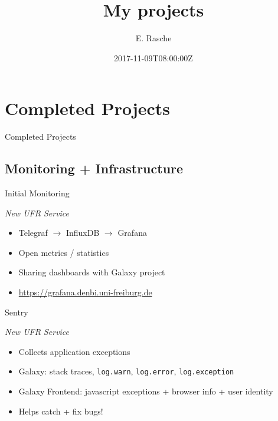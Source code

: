 \documentclass[12pt]{ufrslides}
\title[Projects]{My projects}
\author{E. Rasche}
\date{2017-11-09T08:00:00Z}
\begin{document}
\frame{\titlepage}

\section[Completed]{Completed Projects}
\begin{frame}{Completed Projects}
\end{frame}

\subsection[Monit/Infra]{Monitoring + Infrastructure}
	\begin{frame}{Initial Monitoring}
		\begin{center}
			\emph{New UFR Service}
		\end{center}
		\begin{itemize}
			\item Telegraf $\rightarrow$ InfluxDB $\rightarrow$ Grafana
			\item Open metrics / statistics
			\item Sharing dashboards with Galaxy project
			\item \url{https://grafana.denbi.uni-freiburg.de}
		\end{itemize}
	\end{frame}

	\begin{frame}{Sentry}
		\begin{center}
			\emph{New UFR Service}
		\end{center}
		\begin{itemize}
			\item Collects application exceptions
			\item Galaxy: stack traces, \texttt{log.warn}, \texttt{log.error}, \texttt{log.exception}
			\item Galaxy Frontend: javascript exceptions + browser info + user identity
			\item Helps catch + fix bugs!
		\end{itemize}
	\end{frame}


	{%
		\begin{frame}[plain]
		\end{frame}
	}
\end{document}
